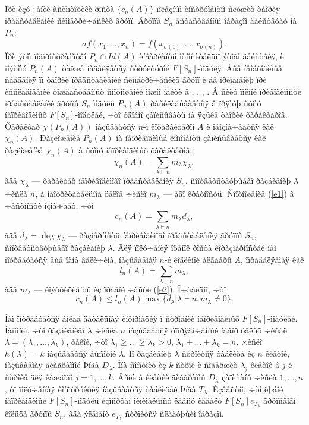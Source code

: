 \documentclass{article}
\numberwithin{equation}{section}
\theoremstyle{plain}
\theoremstyle{definition}
\begin{document}
\begin{fulltext}
\subsection{}\label{s2.2}
Ïðè èçó÷åíèè àñèìïòîòèêè ðîñòà $\{c_n(A)\}$ ïîëåçíûì èíñòðóìåíòîì ñëóæèò òåîðèÿ
ïðåäñòàâëåíèé ñèììåòðè÷åñêèõ ãðóïï. Ãðóïïà $S_n$ åñòåñòâåííûì îáðàçîì äåéñòâóåò íà $P_n$:
$$
\sigma f(x_1,\ldots, x_n) = f(x_{\sigma(1)},\ldots, x_{\sigma(n)}).
$$
Ïðè ýòîì ïîäïðîñòðàíñòâî $P_n\cap Id(A)$ èíâàðèàíòíî îòíîñèòåëüíî ýòîãî äåéñòâèÿ,
è ïîýòîìó $P_n(A)$ òàêæå íàäåëÿåòñÿ ñòðóêòóðîé $F[S_n]$-ìîäóëÿ. Âñå íåîáõîäèìûå ñâåäåíèÿ
ïî òåîðèè ïðåäñòàâëåíèé ñèììåòðè÷åñêèõ ãðóïï è åå ïðèìåíåíèþ ïðè èññëåäîâàíèè òîæäåñòâåííûõ
ñîîòíîøåíèé ìîæíî íàéòè â \cite{J}, \cite{B}, \cite{Dren}, \cite{GZbook}. Â ñèëó
ïîëíîé ïðèâîäèìîñòè ïðåäñòàâëåíèé ãðóïïû $S_n$  ìîäóëü $P_n(A)$ ðàñêëàäûâàåòñÿ â
ïðÿìóþ ñóììó íåïðèâîäèìûõ $F[S_n]$-ìîäóëåé, ÷òî óäîáíî çàïèñûâàòü íà ÿçûêå òåîðèè
õàðàêòåðîâ. Õàðàêòåð $\chi(P_n(A))$ íàçûâàåòñÿ $n$-ì êîõàðàêòåðîì $A$ è îáîçíà÷àåòñÿ êàê
$\chi_n(A)$. Ðàçëîæåíèå $P_n(A)$ íà íåïðèâîäèìûå êîìïîíåíòû çàïèñûâàåòñÿ êàê
ðàçëîæåíèå $\chi_n(A)$ â ñóììó íåïðèâîäèìûõ õàðàêòåðîâ:
\begin{equation}
\label{e1}
\chi_n(A)=\sum_{\lambda\vdash n}m_\lambda \chi_\lambda,
\end{equation}
ãäå $\chi_\lambda$ --- õàðàêòåð íåïðèâîäèìîãî ïðåäñòàâëåíèÿ $S_n$, ñîîòâåòñòâóþùåãî
ðàçáèåíèþ $\lambda$ ÷èñëà $n$, à íåîòðèöàòåëüíîå öåëîå ÷èñëî $m_\lambda$ --- åãî
êðàòíîñòü. Ñîîòíîøåíèå (\ref{e1}) â ÷àñòíîñòè îçíà÷àåò, ÷òî
\begin{equation}
\label{e2}
c_n(A)=\sum_{\lambda\vdash n}m_\lambda d_\lambda,
\end{equation}
ãäå $d_\lambda=\deg \chi_\lambda$ --- ðàçìåðíîñòü íåïðèâîäèìîãî ïðåäñòàâëåíèÿ ãðóïïû
$S_n$, ñîîòâåòñòâóþùåãî ðàçáèåíèþ $\lambda$. Äëÿ ïîëó÷åíèÿ îöåíîê ðîñòà êîðàçìåðíîñòåé íàì ïîòðåáóåòñÿ åùå îäíà âåëè÷èíà, íàçûâàåìàÿ $n$-é êîäëèíîé àëãåáðû $A$, îïðåäåëÿåìàÿ êàê
$$
l_n(A)=\sum_{\lambda\vdash n} m_\lambda,
$$
ãäå $m_\lambda$ --- êîýôôèöèåíòû èç ïðàâîé ÷àñòè (\ref{e2}). Î÷åâèäíî, ÷òî
\begin{equation}
\label{e2a}
c_n(A) \le l_n(A)\max\{d_\lambda\vert \lambda\vdash n, m_\lambda\ne 0\}.
\end{equation}

Íàì ïîòðåáóåòñÿ áîëåå äåòàëüíàÿ èíôîðìàöèÿ î ñòðîåíèè íåïðèâîäèìûõ $F[S_n]$-ìîäóëåé.
Íàïîìíèì, ÷òî ðàçáèåíèåì $\lambda$ ÷èñëà $n$ íàçûâàåòñÿ óïîðÿäî÷åííûé íàáîð öåëûõ ÷èñåë
$\lambda=(\lambda_1,\ldots,\lambda_k)$, òàêîé, ÷òî $\lambda_1\ge\ldots\ge\lambda_k>0$,
$\lambda_1+\ldots+\lambda_k=n$. ×èñëî $h(\lambda)=k$ íàçûâàåòñÿ âûñîòîé $\lambda$. Ïî
ðàçáèåíèþ $\lambda$ ñòðîèòñÿ òàáëèöà èç $n$ êëåòîê, íàçûâàåìàÿ äèàãðàììîé Þíãà $D_\lambda$.
Îíà ñîñòîèò èç $k$ ñòðîê è ñîäåðæèò $\lambda_j$ êëåòîê â $j$-é ñòðîêå äëÿ êàæäîãî
$j=1,\ldots, k$. Åñëè â êëåòêè äèàãðàììû $D_\lambda$ çàïèñàíû ÷èñëà $1,\ldots,n$, òî
ïîëó÷åííàÿ êîíñòðóêöèÿ íàçûâàåòñÿ òàáëèöåé Þíãà $T_\lambda$. Èçâåñòíî, ÷òî ëþáîé 
íåïðèâîäèìûé $F[S_n]$-ìîäóëü èçîìîðôåí ìèíèìàëüíîìó ëåâîìó èäåàëó $F[S_n]e_{T_\lambda}$
ãðóïïîâîãî êîëüöà ãðóïïû $S_n$, ãäå ýëåìåíò $e_{T_\lambda}$ ñòðîèòñÿ ñëåäóþùèì îáðàçîì.


\end{fulltext}
\end{document}
